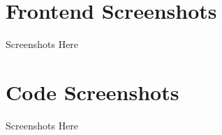 \section{Frontend Screenshots}
\label{s:Frontend-Screenshots1}
Screenshots Here

\section{Code Screenshots}
\label{s:Frontend-Screenshots2}
Screenshots Here
